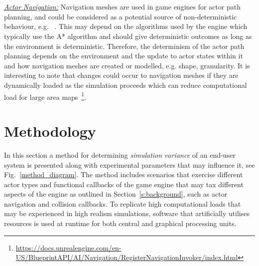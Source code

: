 \documentclass[letterpaper, 10 pt, journal, twoside]{IEEEtran}
\begin{document}
\\\\
\noindent\underline{\textit{Actor Navigation:}}
Navigation meshes are used in game engines for actor path planning, and could be considered as a potential source of non-deterministic behaviour, e.g.%
~\cite{CARLABenchmark}. 
This may depend on the algorithms used by the engine which typically use the A* algorithm\cite{AStarBook} and should give deterministic outcomes as long as the environment is deterministic\cite{AirsimUnrealArticle}\cite{UnrealAIDocumentation}. 
Therefore, the determinism of the actor path planning depends on the environment and the update to actor states within it and how navigation meshes are created or modelled, e.g. shape, granularity. 
%
It is interesting to note that changes could occur to navigation meshes if they are dynamically loaded as the simulation proceeds which can reduce computational load for large area maps~\footnote{\url{https://docs.unrealengine.com/en-US/BlueprintAPI/AI/Navigation/RegisterNavigationInvoker/index.html}}. %


\section{Methodology} \label{s:methodology}
In this section a method for determining \textit{simulation variance} of an end-user system is presented along with experimental parameters that may influence it, see Fig.~\ref{method_diagram}. The method includes scenarios that exercise different actor types and functional callbacks of the game engine that may tax different aspects of the engine as outlined in Section~\ref{s:background}, such as actor navigation and collision callbacks. To replicate high computational loads that may be experienced in high realism simulations, software that artificially utilises resources is used at runtime for both central and graphical processing units. 
\end{document}
